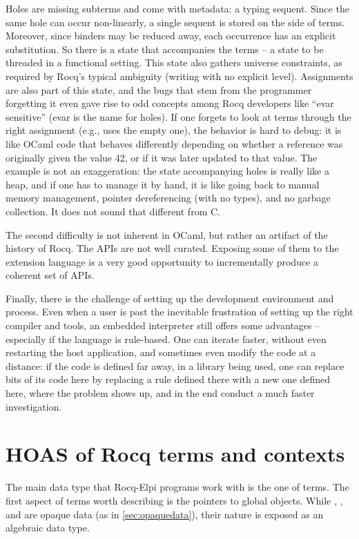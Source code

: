 \documentclass[a4paper, 11pt]{book}
\begin{document}
Holes are missing subterms and come with metadata: a typing sequent. Since the
same hole can occur non-linearly, a single sequent is stored on the side of
terms. Moreover, since binders may be reduced away, each occurrence has an
explicit substitution. So there is a state that accompanies the terms -- a state
to be threaded in a functional setting. This state also gathers universe
constraints, as required by Rocq's typical ambiguity (writing  with
no explicit level).
Assignments are also part of this state, and the bugs that stem from the
programmer forgetting it even gave rise to odd concepts among Rocq developers
like ``evar sensitive'' (evar is the name for holes). If one forgets to look at
terms through the right assignment (e.g., uses the empty one), the behavior is
hard to debug: it is like OCaml code that behaves differently depending on
whether a reference  was originally given the value 42, or if it was
later updated to that value.
The example is not an exaggeration: the state accompanying holes is really like
a heap, and if one has to manage it by hand, it is like going back to manual
memory management, pointer dereferencing (with no types), and no garbage
collection. It does not sound that different from C.

The second difficulty is not inherent in OCaml, but rather an artifact of the
history of Rocq. The APIs are not well curated. Exposing some of them to the
extension language is a very good opportunity to incrementally produce a
coherent set of APIs.

Finally, there is the challenge of setting up the development environment and
process. Even when a user is past the inevitable frustration of setting up the
right compiler and tools, an embedded interpreter still offers some
advantages -- especially if the language is rule-based. One can iterate faster,
without even restarting the host application, and sometimes even modify the
code at a distance: if the code is defined far away, in a library being used,
one can replace bits of its code here by replacing a rule defined there with a
new one defined here, where the problem shows up, and in the end conduct a
much faster investigation.

\section{HOAS of Rocq terms and contexts}\label{GALLINA}


The main data type that Rocq-Elpi programs work with is the one of terms. The
first aspect of terms worth describing is the pointers to global objects.
While , , and  are opaque
data (as in \cref{sec:opaquedata}), their nature is exposed as an algebraic
data type.
\end{document}
